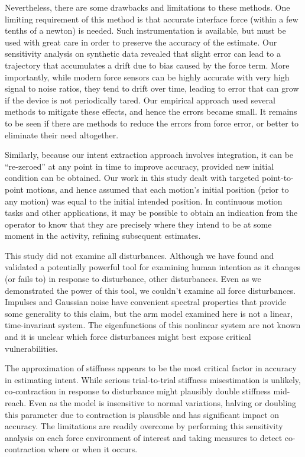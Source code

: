\documentclass[10pt]{article}
\begin{document}
Nevertheless, there are some drawbacks and limitations to these methods.  One limiting requirement of this method is that accurate interface force (within a few tenths of a newton) is needed. Such instrumentation is available, but must be used with great care in order to preserve the accuracy of the estimate. Our sensitivity analysis on synthetic data revealed that slight error can lead to a trajectory that accumulates a drift due to bias caused by the force term. More importantly, while modern force sensors can be highly accurate with very high signal to noise ratios, they tend to drift over time, leading to error that can grow if the device is not periodically tared. Our empirical approach used several methods to mitigate these effects, and hence the errors became small. It remains to be seen if there are methods to reduce the errors from force error, or better to eliminate their need altogether.  

Similarly, because our intent extraction approach involves integration, it  can be “re-zeroed” at any point in time to improve accuracy, provided new initial condition can be obtained. Our work in this study dealt with targeted point-to-point motions, and hence assumed that each motion’s initial position (prior to any motion) was equal to the initial intended position. In continuous motion tasks and other applications, it may be possible to obtain an indication from the operator to know that they are precisely where they intend to be at some moment in the activity, refining subsequent estimates.

This study did not examine all disturbances. Although we have found and validated a potentially powerful tool for examining human intention as it changes (or fails to) in response to disturbance, other disturbances. Even as we demonstrated the power of this tool, we couldn’t examine all force disturbances. Impulses and Gaussian noise have convenient spectral properties that provide some generality to this claim, but the arm model examined here is not a linear, time-invariant system. The eigenfunctions of this nonlinear system are not known and it is unclear which force disturbances might best expose critical vulnerabilities. 

The approximation of stiffness appears to be the most critical factor in accuracy in estimating intent. While serious trial-to-trial stiffness misestimation is unlikely, co-contraction in response to disturbance might plausibly double stiffness mid-reach. Even as the model is insensitive to normal variations, halving or doubling this parameter due to contraction is plausible and has significant impact on accuracy. The limitations are readily overcome by performing this sensitivity analysis on each force environment of interest and taking measures to detect co-contraction where or when it occurs. 
\end{document}
